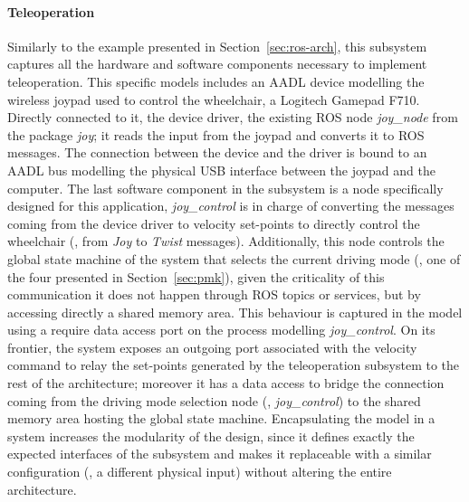 \paragraph{Teleoperation} Similarly to the example presented in Section~\ref{sec:ros-arch}, this subsystem captures all the hardware and software components necessary to implement teleoperation. This specific models includes an AADL device modelling the wireless joypad used to control the wheelchair, a Logitech Gamepad F710. Directly connected to it, the device driver, the existing ROS node \textit{joy\_node} from the package \textit{joy}; it reads the input from the joypad and converts it to ROS messages. The connection between the device and the driver is bound to an AADL bus modelling the physical USB interface between the joypad and the computer. The last software component in the subsystem is a node specifically designed for this application, \textit{joy\_control} is in charge of converting the messages coming from the device driver to velocity set-points to directly control the wheelchair (\ie, from \textit{Joy} to \textit{Twist} messages). Additionally, this node controls the global state machine of the system that selects the current driving mode (\ie, one of the four presented in Section~\ref{sec:pmk}), given the criticality of this communication it does not happen through ROS topics or services, but by accessing directly a shared memory area. This behaviour is captured in the model using a require data access port on the process modelling \textit{joy\_control}. On its frontier, the system exposes an outgoing port associated with the velocity command to relay the set-points generated by the teleoperation subsystem to the rest of the architecture; moreover it has a data access to bridge the connection coming from the driving mode selection node (\ie, \textit{joy\_control}) to the shared memory area hosting the global state machine. Encapsulating the model in a system increases the modularity of the design, since it defines exactly the expected interfaces of the subsystem and makes it replaceable with a similar configuration (\eg, a different physical input) without altering the entire architecture.

